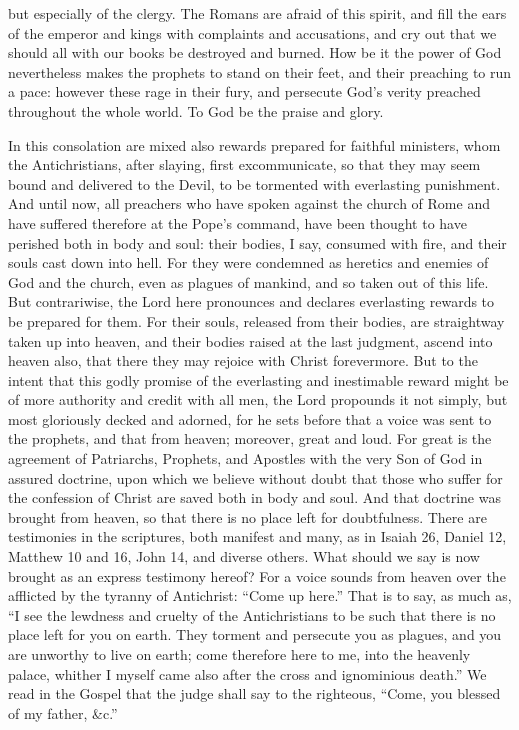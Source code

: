 but especially of the clergy. The Romans are afraid of this spirit, and fill the ears of the emperor and kings with complaints and accusations, and cry out that we should all with our books be destroyed and burned. How be it the power of God nevertheless makes the prophets to stand on their feet, and their preaching to run a pace: however these rage in their fury, and persecute God’s verity preached throughout the whole world. To God be the praise and glory.

In this consolation are mixed also rewards prepared for faithful ministers, whom the Antichristians, after slaying, first excommunicate, so that they may seem bound and delivered to the Devil, to be tormented with everlasting punishment. And until now, all preachers who have spoken against the church of Rome and have suffered therefore at the Pope’s command, have been thought to have perished both in body and soul: their bodies, I say, consumed with fire, and their souls cast down into hell. For they were condemned as heretics and enemies of God and the church, even as plagues of mankind, and so taken out of this life. But contrariwise, the Lord here pronounces and declares everlasting rewards to be prepared for them. For their souls, released from their bodies, are straightway taken up into heaven, and their bodies raised at the last judgment, ascend into heaven also, that there they may rejoice with Christ forevermore. But to the intent that this godly promise of the everlasting and inestimable reward might be of more authority and credit with all men, the Lord propounds it not simply, but most gloriously decked and adorned, for he sets before that a voice was sent to the prophets, and that from heaven; moreover, great and loud. For great is the agreement of Patriarchs, Prophets, and Apostles with the very Son of God in assured doctrine, upon which we believe without doubt that those who suffer for the confession of Christ are saved both in body and soul. And that doctrine was brought from heaven, so that there is no place left for doubtfulness. There are testimonies in the scriptures, both manifest and many, as in Isaiah 26, Daniel 12, Matthew 10 and 16, John 14, and diverse others. What should we say is now brought as an express testimony hereof? For a voice sounds from heaven over the afflicted by the tyranny of Antichrist: “Come up here.” That is to say, as much as, “I see the lewdness and cruelty of the Antichristians to be such that there is no place left for you on earth. They torment and persecute you as plagues, and you are unworthy to live on earth; come therefore here to me, into the heavenly palace, whither I myself came also after the cross and ignominious death.” We read in the Gospel that the judge shall say to the righteous, “Come, you blessed of my father, \&c.”

